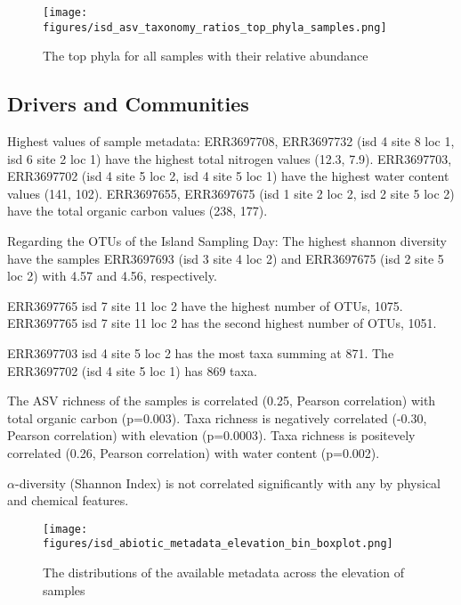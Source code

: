 \begin{figure}[hbt!]
      \centering
      \texttt{[image: figures/isd\_asv\_taxonomy\_ratios\_top\_phyla\_samples.png]}
      \caption[Top phyla of each samples]{The top phyla for all samples with their relative abundance}
      \label{fig:isd_top_phyla_samples}
\end{figure}
   

\subsection{Drivers and Communities}\label{isd_communities}
Highest values of sample metadata:
ERR3697708, ERR3697732 (isd 4 site 8 loc 1, isd 6 site 2 loc 1) have the highest total nitrogen values (12.3, 7.9).
ERR3697703, ERR3697702 (isd 4 site 5 loc 2, isd 4 site 5 loc 1) have the highest water content values (141, 102).
ERR3697655, ERR3697675 (isd 1 site 2 loc 2, isd 2 site 5 loc 2) have the total organic carbon values (238, 177).


Regarding the OTUs of the Island Sampling Day:
The highest shannon diversity have the samples ERR3697693 (isd 3 site 4 loc 2) and
ERR3697675 (isd 2 site 5 loc 2) with 4.57 and 4.56, respectively.

ERR3697765 isd 7 site 11 loc 2 have the highest number of OTUs, 1075.
ERR3697765 isd 7 site 11 loc 2 has the second highest number of OTUs, 1051.

ERR3697703 isd 4 site 5 loc 2 has the most taxa summing at 871.
The ERR3697702 (isd 4 site 5 loc 1) has 869 taxa.

The ASV richness of the samples is correlated (0.25, Pearson correlation) with total organic carbon (p=0.003).
Taxa richness is negatively correlated (-0.30, Pearson correlation) with elevation (p=0.0003). 
Taxa richness is positevely correlated (0.26, Pearson correlation) with water content (p=0.002).

$\alpha$-diversity (Shannon Index) is not correlated significantly with any
by physical and chemical features.


\begin{figure}[hbt!]
      \centering
      \texttt{[image: figures/isd\_abiotic\_metadata\_elevation\_bin\_boxplot.png]}
      \caption[Elevation and metadata distributions]{The distributions of the available metadata across the elevation of samples}
      \label{fig:isd_elevation_metadata}
\end{figure}


